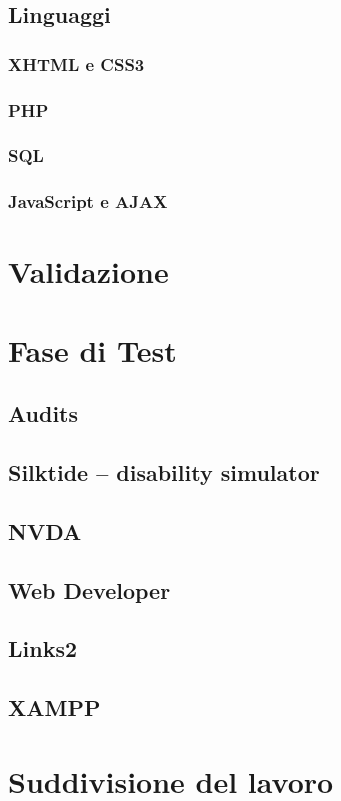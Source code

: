 \documentclass[a4paper, oneside, openany, dvipsnames, table]{article}
\begin{document}
	\subsection{Linguaggi}
		
		\subsubsection{XHTML e CSS3}
			
		\subsubsection{PHP}
			
		\subsubsection{SQL}
			
		\subsubsection{JavaScript e AJAX}
			
\newpage
\section{Validazione}
	
\newpage
\section{Fase di Test}
	
	\subsection{Audits}
		
	\subsection{Silktide – disability simulator}
		
	\subsection{NVDA}
		
	\subsection{Web Developer}
		
	\subsection{Links2}
		
	\subsection{XAMPP}
		
\newpage
\section{Suddivisione del lavoro}
	
						
\end{document}
